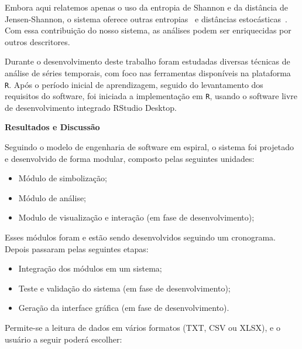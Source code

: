 \documentclass[12pt]{article}
\begin{document}
Embora aqui relatemos apenas o uso da entropia de Shannon e da distância de Jensen-Shannon, o sistema oferece outras entropias~\cite{salicruetal1993} e distâncias estocásticas~\cite{StatisticalInferenceBasedonDivergenceMeasures}.
Com essa contribuição do nosso sistema, as análises podem ser enriquecidas por outros descritores.
 
 Durante o desenvolvimento deste trabalho foram estudadas diversas técnicas de análise de séries temporais, com foco nas ferramentas disponíveis na plataforma \texttt R.
 Após o período inicial de aprendizagem, seguido do levantamento dos requisitos do software, foi iniciada a implementação em \texttt R, usando o software livre de desenvolvimento integrado RStudio Desktop.

\textbf{Resultados e Discussão}

Seguindo o modelo de engenharia de software em espiral, o sistema foi projetado e desenvolvido de forma modular, composto pelas seguintes unidades:

\begin{itemize}
\item Módulo de simbolização;
\item Módulo de análise;
\item Modulo de visualização e interação (em fase de desenvolvimento);
\end{itemize} 

Esses módulos foram e estão sendo desenvolvidos seguindo um cronograma. Depois passaram pelas seguintes etapas:

\begin{itemize}
\item Integração dos módulos em um sistema;
\item Teste e validação do sistema (em fase de desenvolvimento);
\item Geração da interface gráfica (em fase de desenvolvimento).
\end{itemize}

Permite-se a leitura de dados em vários formatos (TXT, CSV ou XLSX), e o usuário a seguir poderá escolher:
\end{document}
